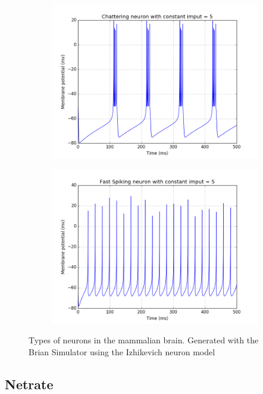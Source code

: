 \documentclass[11pt]{article}
\begin{document}
\begin{figure}
\begin{subfigure}[b]{0.49\textwidth}
		\includegraphics[width=\textwidth]{chattering.png}
	\end{subfigure}
	\begin{subfigure}[b]{0.49\textwidth}
		\includegraphics[width=\textwidth]{fast_spiking.png}
	\end{subfigure}
  \caption{Types of neurons in the mammalian brain. Generated with the Brian Simulator \cite{10.3389/neuro.01.026.2009} using the Izhikevich neuron model \cite{izhikevich2003simple}}
\end{figure}


\subsection{Netrate}
\end{document}
